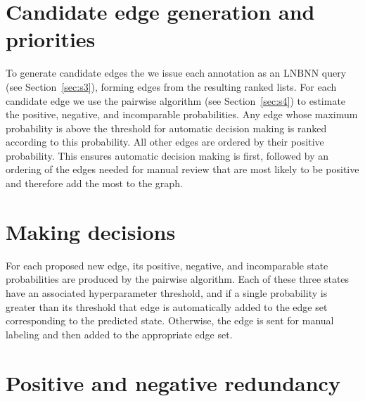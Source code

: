 


\section{Candidate edge generation and priorities}\label{sec:cand}
To generate candidate edges the we issue each annotation as an LNBNN query
  (see Section~\ref{sec:s3}), forming edges from the resulting ranked lists.
For each candidate edge we use the pairwise algorithm (see
  Section~\ref{sec:s4}) to estimate the positive, negative, and incomparable
  probabilities.
Any edge whose maximum probability is above the threshold for automatic
  decision making is ranked according to this probability.
All other edges are ordered by their positive probability.
This ensures automatic decision making is first, followed by an ordering of
  the edges needed for manual review that are most likely to be positive and
  therefore add the most to the graph.

\section{Making decisions}\label{sec:decision}


For each proposed new edge, its positive, negative, and incomparable state
  probabilities are produced by the pairwise algorithm.
Each of these three states have an associated hyperparameter threshold, and if
  a single probability is greater than its threshold that edge is automatically
  added to the edge set corresponding to the predicted state.
Otherwise, the edge is sent for manual labeling and then added to the
  appropriate edge set.

\section{Positive and negative redundancy}\label{sec:redun}

